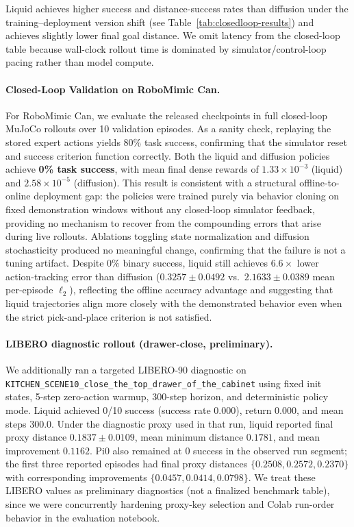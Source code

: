 \documentclass{article}
\begin{document}
Liquid achieves higher success and distance-success rates than diffusion under the training--deployment version shift (see Table~\ref{tab:closedloop-results}) and achieves slightly lower final goal distance. We omit latency from the closed-loop table because wall-clock rollout time is dominated by simulator/control-loop pacing rather than model compute.

\paragraph{Closed-Loop Validation on RoboMimic Can.}
For RoboMimic Can, we evaluate the released checkpoints in full closed-loop MuJoCo rollouts over 10 validation episodes. As a sanity check, replaying the stored expert actions yields 80\% task success, confirming that the simulator reset and success criterion function correctly. Both the liquid and diffusion policies achieve \textbf{0\% task success}, with mean final dense rewards of $1.33 \times 10^{-3}$ (liquid) and $2.58 \times 10^{-5}$ (diffusion). This result is consistent with a structural offline-to-online deployment gap: the policies were trained purely via behavior cloning on fixed demonstration windows without any closed-loop simulator feedback, providing no mechanism to recover from the compounding errors that arise during live rollouts. Ablations toggling state normalization and diffusion stochasticity produced no meaningful change, confirming that the failure is not a tuning artifact. Despite 0\% binary success, liquid still achieves $6.6\times$ lower action-tracking error than diffusion ($0.3257 \pm 0.0492$ vs.\ $2.1633 \pm 0.0389$ mean per-episode $\ell_2$), reflecting the offline accuracy advantage and suggesting that liquid trajectories align more closely with the demonstrated behavior even when the strict pick-and-place criterion is not satisfied.

\paragraph{LIBERO diagnostic rollout (drawer-close, preliminary).}
We additionally ran a targeted LIBERO-90 diagnostic on \texttt{KITCHEN\_SCENE10\_close\_the\_top\_drawer\_of\_the\_cabinet} using fixed init states, 5-step zero-action warmup, 300-step horizon, and deterministic policy mode. Liquid achieved 0/10 success (success rate 0.000), return 0.000, and mean steps 300.0. Under the diagnostic proxy used in that run, liquid reported final proxy distance $0.1837 \pm 0.0109$, mean minimum distance $0.1781$, and mean improvement $0.1162$. Pi0 also remained at 0 success in the observed run segment; the first three reported episodes had final proxy distances $\{0.2508, 0.2572, 0.2370\}$ with corresponding improvements $\{0.0457, 0.0414, 0.0798\}$. We treat these LIBERO values as preliminary diagnostics (not a finalized benchmark table), since we were concurrently hardening proxy-key selection and Colab run-order behavior in the evaluation notebook.
\end{document}
